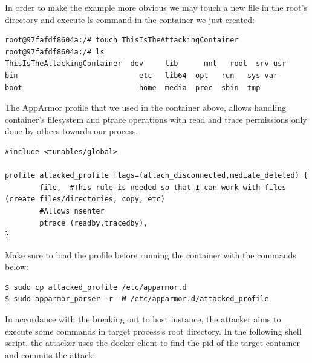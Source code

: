 In order to make the example more obvious we may touch a new file in the root's directory and execute ls command in the container we just created:

\begin{lstlisting}[style=terminal]
root@97fafdf8604a:/# touch ThisIsTheAttackingContainer
root@97fafdf8604a:/# ls
ThisIsTheAttackingContainer  dev     lib	  mnt   root  srv usr
bin                            etc   lib64  opt   run   sys var
boot                           home  media  proc  sbin  tmp
\end{lstlisting}

The AppArmor profile that we used in the container above, allows handling container's filesystem and ptrace operations with read and trace permissions only done by others towards our process.

\begin{lstlisting}[style=Dockerfile, caption={AppArmor profile attacked\_profile}]
#include <tunables/global>

profile attacked_profile flags=(attach_disconnected,mediate_deleted) {
        file,  #This rule is needed so that I can work with files (create files/directories, copy, etc)
        #Allows nsenter
        ptrace (readby,tracedby),
}
\end{lstlisting}

Make sure to load the profile before running the container with the commands below:

\begin{lstlisting}[style=terminal]
$ sudo cp attacked_profile /etc/apparmor.d
$ sudo apparmor_parser -r -W /etc/apparmor.d/attacked_profile
\end{lstlisting}

In accordance with the breaking out to host instance, the attacker aims to execute some commands in target process's root directory.
In the following shell script, the attacker uses the docker client to find the pid of the target container and commits the attack:

